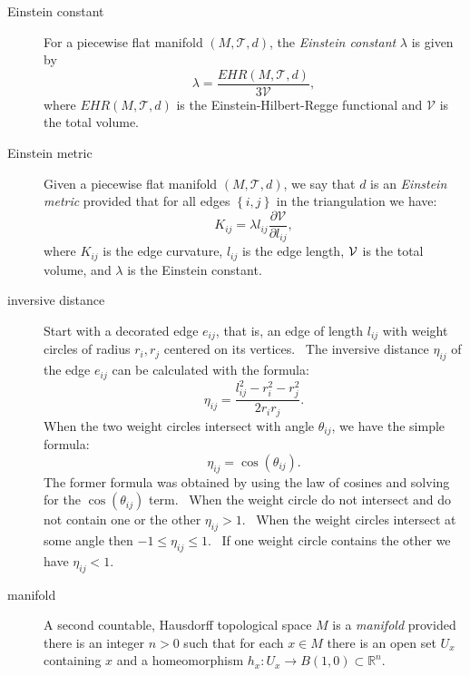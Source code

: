 \begin{description}
\item[Einstein constant] For a piecewise flat manifold $\left( M,\mathcal{T}%
,d\right) $, the \textit{Einstein constant} $\lambda $ is given by%
\begin{equation*}
\lambda =\frac{EHR\left( M,\mathcal{T},d\right) }{3\mathcal{V}},
\end{equation*}%
where $EHR\left( M,\mathcal{T},d\right) $ is the Einstein-Hilbert-Regge
functional and $\mathcal{V}$ is the total volume.

\item[Einstein metric] Given a piecewise flat manifold $\left( M,\mathcal{T}%
,d\right) $, we say that $d$ is an \textit{Einstein metric} provided that
for all edges $\left\{ i,j\right\} $ in the triangulation we have:%
\begin{equation*}
K_{ij}=\lambda l_{ij}\frac{\partial \mathcal{V}}{\partial l_{ij}},
\end{equation*}%
where $K_{ij}$ is the edge curvature, $l_{ij}$ is the edge length, $\mathcal{%
V}$ is the total volume, and $\lambda $ is the Einstein constant.

\item[inversive distance] Start with a decorated edge $e_{ij}$, that is, an
edge of length $l_{ij}$ with weight circles of radius $r_{i},r_{j}$ centered
on its vertices. \ The inversive distance $\eta _{ij}$ of the edge $e_{ij}$
can be calculated with the formula:%
\begin{equation*}
\eta _{ij}=\frac{l_{ij}^{2}-r_{i}^{2}-r_{j}^{2}}{2r_{i}r_{j}}.
\end{equation*}%
When the two weight circles intersect with angle $\theta _{ij}$, we have the
simple formula:%
\begin{equation*}
\eta _{ij}=\cos \left( \theta _{ij}\right) .
\end{equation*}%
The former formula was obtained by using the law of cosines and solving for
the $\cos \left( \theta _{ij}\right) $ term. \ When the weight circle do not
intersect and do not contain one or the other $\eta _{ij}>1$. \ When the
weight circles intersect at some angle then $-1\leq \eta _{ij}\leq 1$. \ If
one weight circle contains the other we have $\eta _{ij}<1$. \ 

\item[manifold] A second countable, Hausdorff topological space $M$ is a 
\textit{manifold} provided there is an integer $n>0$ such that for each $%
x\in M$ there is an open set $U_{x}$ containing $x$ and a homeomorphism $%
h_{x}:U_{x}\rightarrow B\left( 1,0\right) \subset 
\mathbb{R}
^{n}$.


\end{description}

